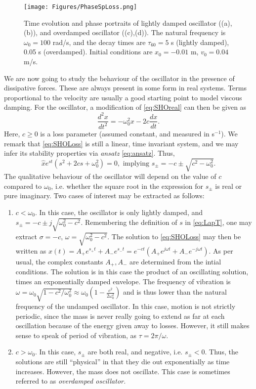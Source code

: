 \begin{figure}[hbt]
    \centering
    \texttt{[image: Figures/PhaseSpLoss.png]}
    \caption{Time evolution and phase portraits of lightly damped oscillator ((a),(b)), and overdamped oscillator ((c),(d)). The natural frequency is $\omega_0=100$ rad/s, and the decay times are $\tau_{60}=5$ s (lightly damped), 0.05 s (overdamped). Initial conditions are $x_0=-0.01$ m, $v_0=0.04$ m/s.}\label{fig:dampedOsc}
\end{figure}
We are now going to study the behaviour of the oscillator in the presence of dissipative forces. These are always present in some form in real systems. Terms proportional to the velocity are usually a good starting point to model viscous damping. For the oscillator, a modification of \eqref{eq:SHOreal} can then be given as
\begin{equation}\label{eq:SHOLoss}
    \frac{d^2 x}{dt^2} = -\omega_0^2 x - 2c \frac{dx}{dt}.
\end{equation}
Here, $c \geq 0$ is a loss parameter (assumed constant, and measured in s$^{-1}$). We remark that \eqref{eq:SHOLoss} is still a linear, time invariant system, and we may infer its stability properties via \emph{ansatz} \eqref{eq:ansatz}. Thus, 
\begin{equation}\label{eq:LossAnsatz}
    \hat x e^{st}\left(s^2 + 2c s + \omega_0^2 \right) = 0, \,\, \text{implying}\,\, s_{\pm} = -{c} \pm \sqrt{{c}^2 - \omega_0^2}.
\end{equation}
The qualitative behaviour of the oscillator will depend on the value of $c$ compared to $\omega_0$, i.e. whether the square root in the expression for $s_\pm$ is real or pure imaginary. Two cases of interest may be extracted as follows:
\begin{enumerate}
    \item $c<\omega_0$. In this case, the oscillator is only lightly damped, and $s_\pm = -c \pm j \sqrt{\omega_0^2-c^2}$. Remembering the definition of $s$ in \eqref{eq:LapT}, one may extract $\sigma = - c$, $\omega = \sqrt{\omega_0^2-c^2}$. The solution to \eqref{eq:SHOLoss} may then be written as $x(t) = A_+ e^{s_+ t} + A_- e^{s_- t} = e^{-c t}\left(A_+ e^{j \omega t} + A_- e^{-j\omega t} \right)$. As per usual, the complex constants $A_+,A_-$ are determined from the intial conditions. The solution is in this case the product of an oscillating solution, times an exponentially damped envelope. The frequency of vibration is $\omega = \omega_0\sqrt{1 - c^2/\omega_0^2}\approx \omega_0\left(1 - \frac{c^2}{2\omega_0^2} \right)$ and is thus lower than the natural frequency of the undamped oscillator. In this case, motion is not strictly periodic, since the mass is never really going to extend as far at each oscillation because of the energy given away to losses. However, it still makes sense to speak of period of vibration, as $\tau = 2\pi / \omega.$ 
    \item $c>\omega_0$. In this case, $s_\pm$ are both real, and negative, i.e. $s_\pm < 0$. Thus, the solutions are still ``physical'' in that they die out exponentially as time increases. However, the mass does not oscillate. This case is sometimes referred to as \emph{overdamped oscillator.}
\end{enumerate}
